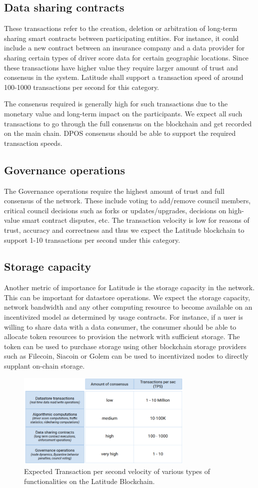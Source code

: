 \subsection{Data sharing contracts}
These transactions refer to the creation, deletion or arbitration of long-term sharing smart contracts between
participating entities. For instance, it could include a new contract between an insurance company and a data provider
for sharing certain types of driver score data for certain geographic locations. Since these transactions have higher
value they require larger amount of trust and consensus in the system. Latitude shall support a transaction speed of
around 100-1000 transactions per second for this category.

The consensus required is generally high for such transactions due to the monetary value and long-term impact on the
participants. We expect all such transactions to go through the full consensus on the blockchain and get recorded on the
main chain. DPOS consensus should be able to support the required transaction speeds. 

\subsection{Governance operations}
The Governance operations require the highest amount of trust and full consensus of the network. These include voting to
add/remove council members, critical council decisions such as forks or updates/upgrades, decisions on high-value smart
contract disputes, etc. The transaction velocity is low for reasons of trust, accuracy and correctness and thus we
expect the Latitude blockchain to support 1-10 transactions per second under this category.

\subsection{Storage capacity}
Another metric of importance for Latitude is the storage capacity in the network. This can be important for
datastore operations. We expect the storage capacity, network bandwidth and any other computing resource to become
available on an incentivized model as determined by usage contracts. For instance, if a user is willing to share data with
a data consumer, the consumer should be able to allocate token resources to provision the network with sufficient
storage. The token can be used to purchase storage using other blockchain storage providers such as Filecoin, Siacoin or
Golem can be used to incentivized nodes to directly supplant on-chain storage.

\begin{figure}[t]
    \centering
    \includegraphics[width=0.75\textwidth]{tps_lat2.png}
  \caption{Expected Transaction per second velocity of various types of functionalities on the Latitude Blockchain.}
    \label{fig:tps_lat}
\end{figure}

